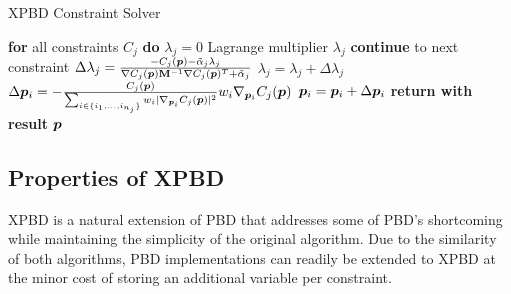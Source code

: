 \begin{algorithm}
\caption{XPBD Constraint Solver}\label{alg:xpbd-solver}
\begin{algorithmic}[1]
\State \textbf{for} all constraints $C_j$ \textbf{do} $\lambda_j = 0$
\StatexIndent[3] Lagrange multiplier $\lambda_j$ \algorithmicdo
{}
\State \textbf{continue} to next constraint
\EndIf
\State $\Delta \lambda_j = \frac{-C_j(\bm{p}) - \tilde{\alpha}_j \lambda_{j}}{\nabla C_j(\bm{p}) \mathbf{M}^{-1} \nabla C_j(\bm{p})^T + \tilde{\alpha}_j}$
\State $\lambda_{j} = \lambda_{j} + \Delta \lambda_j$
\State $\Delta \bm{p}_i = -\frac{C_j(\bm{p})}{\sum_{i \in \{ i_1, \ldots, i_{n_j} \}} w_i \vert \nabla_{\bm{p}_i}C_j(\bm{p}) \vert^2 } w_i 
\nabla_{\bm{p}_i} C_j(\bm{p})$
\State $\bm{p}_i = \bm{p}_i + \Delta \bm{p}_i$
\EndFor
\EndFor
\EndFor
\State \textbf{return with result } $\bm{p}$
\EndProcedure
\end{algorithmic}
\end{algorithm}

\subsection{Properties of XPBD}\label{ss:xpbd-properties}
XPBD is a natural extension of PBD that addresses some of PBD's shortcoming while maintaining the simplicity of the original algorithm. Due to
the similarity of both algorithms, PBD implementations can readily be extended to XPBD at the minor cost of storing an additional variable per 
constraint.

